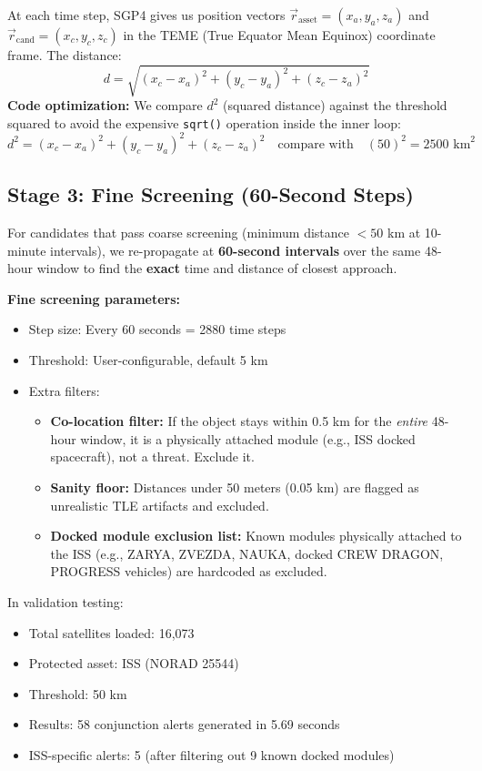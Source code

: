\documentclass[12pt,a4paper]{article}
\begin{document}
\begin{formulabox}[title=Formula: 3D Euclidean Distance]
At each time step, SGP4 gives us position vectors $\vec{r}_{\text{asset}} = (x_a, y_a, z_a)$ and $\vec{r}_{\text{cand}} = (x_c, y_c, z_c)$ in the TEME (True Equator Mean Equinox) coordinate frame. The distance:
\[
d = \sqrt{(x_c - x_a)^2 + (y_c - y_a)^2 + (z_c - z_a)^2}
\]
\textbf{Code optimization:} We compare $d^2$ (squared distance) against the threshold squared to avoid the expensive \texttt{sqrt()} operation inside the inner loop:
\[
d^2 = (x_c - x_a)^2 + (y_c - y_a)^2 + (z_c - z_a)^2 \quad \text{compare with} \quad (50)^2 = 2500 \text{ km}^2
\]
\end{formulabox}

\subsection{Stage 3: Fine Screening (60-Second Steps)}

For candidates that pass coarse screening (minimum distance $< 50$ km at 10-minute intervals), we re-propagate at \textbf{60-second intervals} over the same 48-hour window to find the \textbf{exact} time and distance of closest approach.

\textbf{Fine screening parameters:}
\begin{itemize}
    \item Step size: Every 60 seconds = 2880 time steps
    \item Threshold: User-configurable, default 5 km
    \item Extra filters:
    \begin{itemize}
        \item \textbf{Co-location filter:} If the object stays within 0.5 km for the \textit{entire} 48-hour window, it is a physically attached module (e.g., ISS docked spacecraft), not a threat. Exclude it.
        \item \textbf{Sanity floor:} Distances under 50 meters (0.05 km) are flagged as unrealistic TLE artifacts and excluded.
        \item \textbf{Docked module exclusion list:} Known modules physically attached to the ISS (e.g., ZARYA, ZVEZDA, NAUKA, docked CREW DRAGON, PROGRESS vehicles) are hardcoded as excluded.
    \end{itemize}
\end{itemize}

\begin{realdatabox}[title=Real Data: Triage Performance]
In validation testing:
\begin{itemize}
    \item Total satellites loaded: 16,073
    \item Protected asset: ISS (NORAD 25544)
    \item Threshold: 50 km
    \item Results: 58 conjunction alerts generated in 5.69 seconds
    \item ISS-specific alerts: 5 (after filtering out 9 known docked modules)
\end{itemize}
\end{realdatabox}
\end{document}
